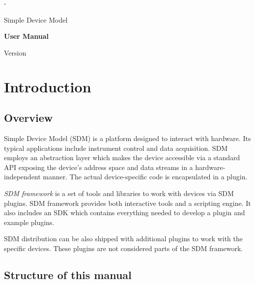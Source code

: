\documentclass[a4paper,12pt,twoside,extrafontsizes]{memoir}
\begin{document}
\begin{titlingpage}
\calccentering{\unitlength}
\begin{adjustwidth*}{\unitlength}{-\unitlength}
	\vspace*{\fill}
	\begin{center}
	\DoubleSpacing
	\huge Simple Device Model\par
	\vspace{\onelineskip}
	\LARGE \textbf{User Manual}\par
	\vspace{1.2\onelineskip}
	\large Version \productversion\par
	\end{center}
	\vspace*{\fill}
\end{adjustwidth*}
\end{titlingpage}


\tableofcontents*

\chapter{Introduction}

\section{Overview}

Simple Device Model (SDM) is a platform designed to interact with hardware. Its typical applications include instrument control and data acquisition. SDM employs an abstraction layer which makes the device accessible via a standard API exposing the device's address space and data streams in a hardware-independent manner. The actual device-specific code is encapsulated in a plugin.

\emph{SDM framework} is a set of tools and libraries to work with devices via SDM plugins. SDM framework provides both interactive tools and a scripting engine. It also includes an SDK which contains everything needed to develop a plugin and example plugins.

SDM distribution can be also shipped with additional plugins to work with the specific devices. These plugins are not considered parts of the SDM framework.

\section{Structure of this manual}
\end{document}
